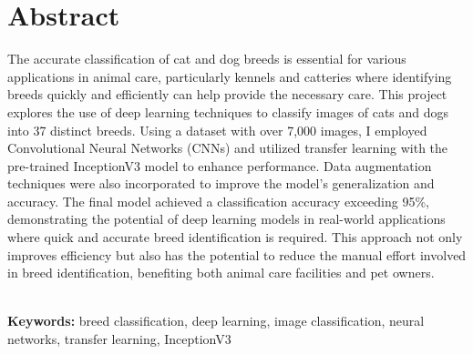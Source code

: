 
\chapter*{\center \Large  Abstract}
The accurate classification of cat and dog breeds is essential for various applications in animal care, particularly kennels and catteries where identifying breeds quickly and efficiently can help provide the necessary care. This project explores the use of deep learning techniques to classify images of cats and dogs into 37 distinct breeds. Using a dataset with over 7,000 images, I employed Convolutional Neural Networks (CNNs) and utilized transfer learning with the pre-trained InceptionV3 model to enhance performance. Data augmentation techniques were also incorporated to improve the model's generalization and accuracy. The final model achieved a classification accuracy exceeding 95\%, demonstrating the potential of deep learning models in real-world applications where quick and accurate breed identification is required. This approach not only improves efficiency but also has the potential to reduce the manual effort involved in breed identification, benefiting both animal care facilities and pet owners.

~\\[1cm]
\noindent 
\textbf{Keywords:} breed classification, deep learning, image classification, neural networks, transfer learning, InceptionV3

